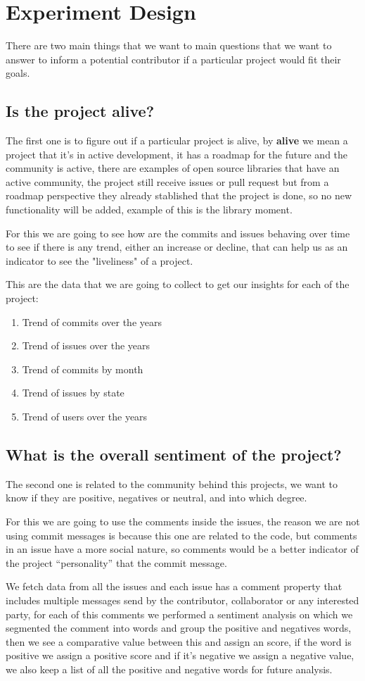 \section{Experiment Design}
There are two main things that we want to main questions that we want to answer to inform a potential contributor if a particular project would fit their goals.

\subsection{Is the project alive?}
The first one is to figure out if a particular project is alive, by \textbf{alive} we mean a project that it's in active development, it has a roadmap for the future and the community is active, there are examples of open source libraries that have an active community, the project still receive issues or pull request but from a roadmap perspective they already stablished that the project is done, so no new functionality will be added, example of this is the library moment\cite{moment}.

For this we are going to see how are the commits and issues behaving over time to see if there is any trend, either an increase or decline, that can help us as an indicator to see the "liveliness" of a project.

This are the data that we are going to collect to get our insights for each of the project:
\begin{enumerate}
    \fontsize{10pt}{10pt}
    \selectfont
    \item Trend of commits over the years
    \item Trend of issues over the years
    \item Trend of commits by month
    \item Trend of issues by state
    \item Trend of users over the years
\end{enumerate}

\subsection{What is the overall sentiment of the project?}
The second one is related to the community behind this projects, we want to know if they are positive, negatives or neutral, and into which degree.

For this we are going to use the comments inside the issues, the reason we are not using commit messages is because this one are related to the code, but comments in an issue have a more social nature, so comments would be a better indicator of the project “personality” that the commit message.

We fetch data from all the issues and each issue has a comment property that includes multiple messages send by the contributor, collaborator or any interested party, for each of this comments we performed a sentiment analysis on which we segmented the comment into words and group the positive and negatives words, then we see a comparative value between this and assign an score, if the word is positive we assign a positive score and if it’s negative we assign a negative value, we also keep a list of all the positive and negative words for future analysis.